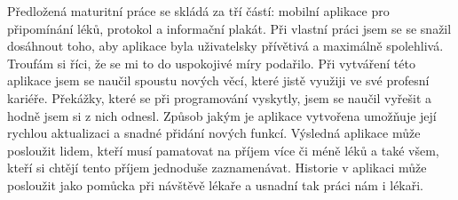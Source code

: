 \documentclass[../TakeYourPill.tex]{subfiles}
\begin{document}
Předložená maturitní práce se skládá za tří částí: mobilní aplikace pro připomínání léků, protokol a informační plakát. Při vlastní práci jsem se se snažil dosáhnout toho, aby aplikace byla uživatelsky přívětivá a maximálně spolehlivá. Troufám si říci, že se mi to do uspokojivé míry podařilo. Při vytváření této aplikace jsem se naučil spoustu nových věcí, které jistě využiji ve své profesní kariéře. Překážky, které se při programování vyskytly, jsem se naučil vyřešit a hodně jsem si z nich odnesl. Způsob jakým je aplikace vytvořena umožňuje její rychlou aktualizaci a snadné přidání nových funkcí. Výsledná aplikace může posloužit lidem, kteří musí pamatovat na příjem více či méně léků a také všem, kteří si chtějí tento příjem jednoduše zaznamenávat. Historie v aplikaci může posloužit jako pomůcka při návštěvě lékaře a usnadní tak práci nám i lékaři.
\end{document}
